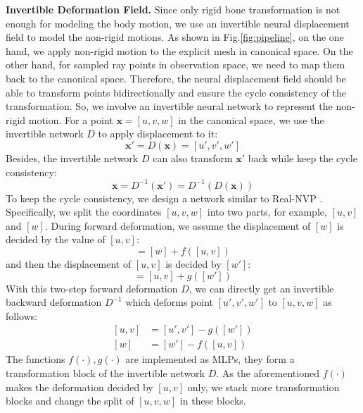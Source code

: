 \textbf{Invertible Deformation Field.}
Since only rigid bone transformation is not enough for modeling the body motion, we use an invertible neural displacement field to model the non-rigid motions. 
As shown in Fig.\ref{fig:pipeline}, on the one hand, we apply non-rigid motion to the explicit mesh in canonical space.
On the other hand, for sampled ray points in observation space, we need to map them back to the canonical space.
Therefore, the neural displacement field should be able to transform points bidirectionally and ensure the cycle consistency of the transformation.
So, we involve an invertible neural network to represent the non-rigid motion. 
For a point $\mathbf{x} = \left[u, v, w\right]$ in the canonical space, we use the invertible network $D$ to apply displacement to it: 
\begin{equation}
    \mathbf{x}' = D(\mathbf{x}) = \left[u', v', w'\right]
\end{equation}
Besides, the invertible network $D$ can also transform $\mathbf{x}'$ back while keep the cycle consistency:
\begin{equation}
    \mathbf{x} =  D^{-1}(\mathbf{x}') = D^{-1}(D(\mathbf{x}))
\end{equation}
To keep the cycle consistency, we design a network similar to Real-NVP \cite{real-nvp}.
Specifically, we split the coordinates $[u, v, w]$ into two parts, for example, $[u, v]$ and $[w]$. 
During forward deformation, we assume the displacement of $[w]$ is decided by the value of $[u, v]$: 
\begin{equation}
    [w'] = [w] + f([u, v])
\end{equation}
and then the displacement of $[u, v]$ is decided by $[w']$:
\begin{equation}
    [u', v'] = [u, v] + g([w'])
\end{equation}
With this two-step forward deformation $D$, we can directly get an invertible backward deformation $D^{-1}$ which deforms point $[u', v', w']$ to $[u, v, w]$ as follows:
\begin{equation}
\begin{aligned}
    [u, v] & = [u', v'] - g([w']) \\
    [w] & = [w'] - f([u, v])
\end{aligned}
\end{equation}
The functions $f(\cdot), g(\cdot)$ are implemented as MLPs, they form a transformation block of the invertible network $D$.
As the aforementioned $f(\cdot)$ makes the deformation decided by $[u, v]$ only, we stack more transformation blocks and change the split of $[u, v, w]$ in these blocks. 
